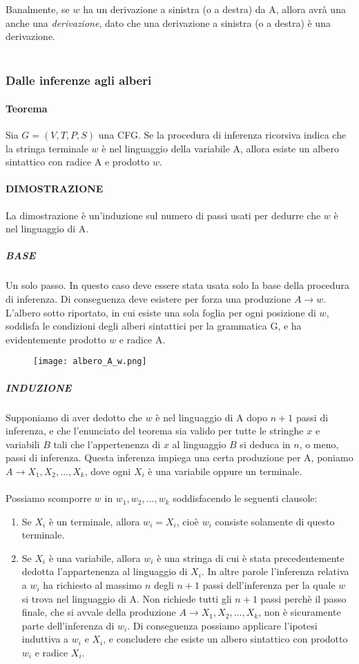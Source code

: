 \documentclass[11pt]{article}
\begin{document}
Banalmente, se $w$ ha un derivazione a sinistra (o a destra) da A, allora avrà una anche una \textit{derivazione}, dato che una derivazione a sinistra (o a destra) è una derivazione.
\\\\
\subsubsection*{Dalle inferenze agli alberi}
\paragraph*{\textbf{Teorema}} Sia $G=(V,T,P,S)$ una CFG. Se la procedura di inferenza ricorsiva indica che la stringa terminale $w$ è nel linguaggio della variabile A, allora esiste un albero sintattico con radice A e prodotto $w$.
\paragraph*{DIMOSTRAZIONE} La dimostrazione è un'induzione sul numero di passi usati per dedurre che $w$ è nel linguaggio di A.

\subparagraph*{BASE} Un solo passo. In questo caso deve essere stata usata solo la base della procedura di inferenza. Di conseguenza deve esistere per forza una produzione $A \rightarrow w$. L'albero sotto riportato, in cui esiste una sola foglia per ogni posizione di $w$, soddisfa le condizioni degli alberi sintattici per la grammatica G, e ha evidentemente prodotto $w$ e radice A.

\begin{figure}[H]
\texttt{[image: albero\_A\_w.png]}
\centering
\end{figure}

\subparagraph*{INDUZIONE} Supponiamo di aver dedotto che $w$ è nel linguaggio di A dopo $n+1$ passi di inferenza, e che l'enunciato del teorema sia valido per tutte le stringhe $x$ e variabili $B$ tali che l'appertenenza di $x$ al linguaggio $B$ si deduca in $n$, o meno, passi di inferenza. Questa inferenza impiega una certa produzione per A, poniamo $A \rightarrow X_1, X_2,...,X_k$, dove ogni $X_i$ è una variabile oppure un terminale.
\\ \\
Possiamo scomporre $w$ in $w_1,w_2,...,w_k$ soddisfacendo le seguenti clausole:
\begin{enumerate}
	\item Se $X_i$ è un terminale, allora $w_i = X_i$, cioè $w_i$ consiste solamente di questo terminale.
	\item Se $X_i$ è una variabile, allora $w_i$ è una stringa di cui è stata precedentemente dedotta l'appartenenza al linguaggio di $X_i$. In altre parole l'inferenza relativa a $w_i$ ha richiesto al massimo $n$ degli $n+1$ passi dell'inferenza per la quale $w$ si trova nel linguaggio di A. Non richiede tutti gli $n+1$ passi perchè il passo finale, che si avvale della produzione $A \rightarrow X_1, X_2, ..., X_k$, non è sicuramente parte dell'inferenza di $w_i$. Di conseguenza possiamo applicare l'ipotesi induttiva a $w_i$ e $X_i$, e concludere che esiste un albero sintattico con prodotto $w_i$ e radice $X_i$.	
\end{enumerate}
\end{document}
